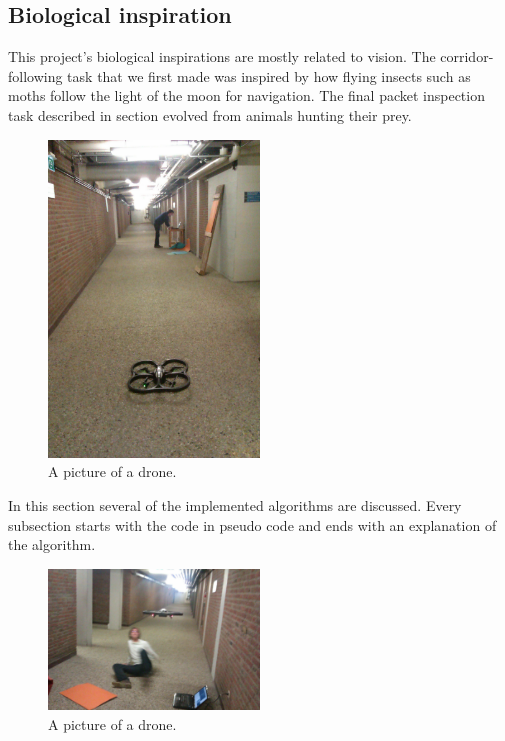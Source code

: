 \documentclass[a4paper,10pt]{article}
\begin{document}
\subsection{Biological inspiration}
This project's biological inspirations are mostly related to vision. The
corridor-following task that we first made was inspired by how flying insects such as moths
follow the light of the moon for navigation. The final packet inspection task described in section 
evolved from animals hunting their prey.
\begin{figure}[h!]
	\caption{A picture of a drone.}
	\centering
	\includegraphics[width=0.5\textwidth]{images/boringHallway}
\end{figure}

In this section several of the implemented algorithms are discussed. Every subsection starts with the code in pseudo code and ends with an explanation of the algorithm. 

\begin{figure}[h!]
	\caption{A picture of a drone.}
	\centering
	\includegraphics[width=0.5\textwidth]{images/droneAttack}
\end{figure}
\end{document}
